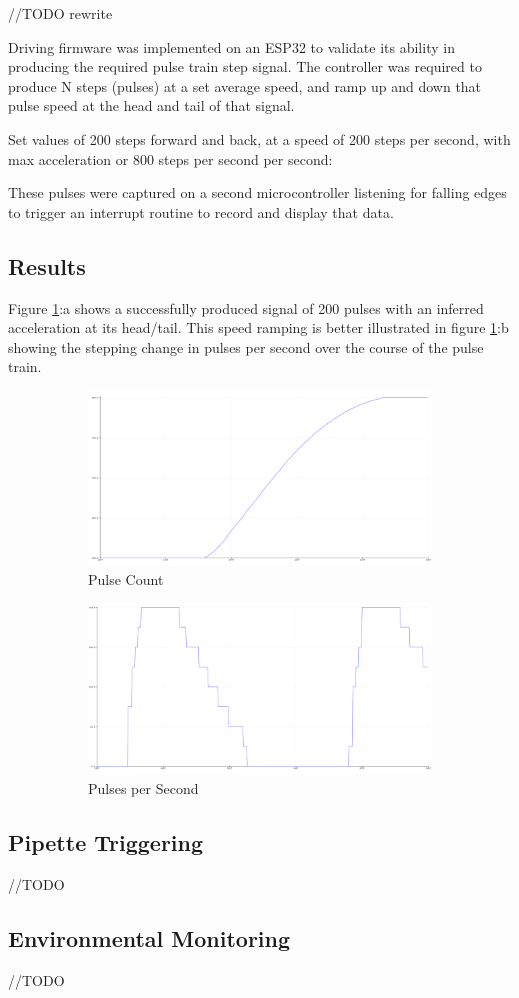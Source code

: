 //TODO rewrite

Driving firmware was implemented on an ESP32 to validate its ability in producing the required pulse train step signal. The controller was required to produce N steps (pulses) at a set average speed, and ramp up and down that pulse speed at the head and tail of that signal.

Set values of 200 steps forward and back, at a speed of 200 steps per second, with max acceleration or 800 steps per second per second:

These pulses were captured on a second microcontroller listening for falling edges to trigger an interrupt routine to record and display that data.

\subsection{Results}

Figure \ref{fig:code}:a shows a successfully produced signal of 200 pulses with an inferred acceleration at its head/tail. This speed ramping is better illustrated in figure \ref{fig:code}:b showing the stepping change in pulses per second over the course of the pulse train.

\begin{figure}[h]
    \centering
    \begin{subfigure}{.45\textwidth}
        \centering
        \includegraphics[width=0.8\linewidth]{img/stepper_pulses.PNG}
        \caption{Pulse Count}
    \end{subfigure}%
    \begin{subfigure}{.45\textwidth}
        \centering
        \includegraphics[width=0.8\linewidth]{img/stepper_pulse_acc.PNG}
        \caption{Pulses per Second}
    \end{subfigure}
    \caption{}
    \label{fig:code}
\end{figure}

\subsection{Pipette Triggering}
//TODO
\subsection{Environmental Monitoring}
//TODO